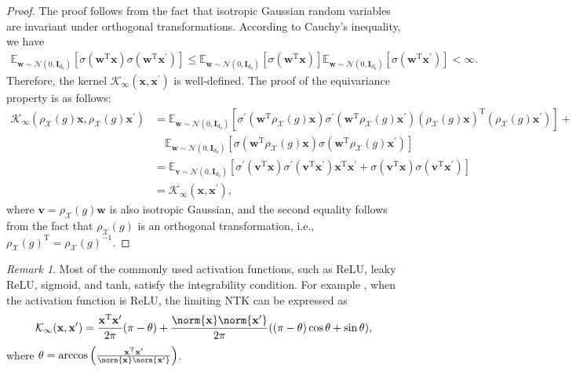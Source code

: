 \documentclass{article}
\newcommand{\T}{\mathrm{T}}
\newcommand{\X}{\mathcal{X}}
\theoremstyle{plain}
\theoremstyle{definition}
\theoremstyle{remark}
\newtheorem{remark}[theorem]{Remark}
\theoremstyle{remark}
\begin{document}
\begin{proof}
  The proof follows from the fact that isotropic Gaussian random variables are invariant under orthogonal transformations.
  According to Cauchy's inequality, we have 
  \begin{align*}
    \mathbb{E}_{\mathbf{w} \sim \mathcal{N}(0, \mathbf{I}_{d_0})}{\left[\sigma\left(\mathbf{w}^{\T} \mathbf{x}\right)\sigma\left(\mathbf{w}^{\T} \mathbf{x}^\prime\right)\right]} \leq \mathbb{E}_{\mathbf{w} \sim \mathcal{N}(0, \mathbf{I}_{d_0})}{\left[\sigma\left(\mathbf{w}^{\T} \mathbf{x}\right)\right]} \mathbb{E}_{\mathbf{w} \sim \mathcal{N}(0, \mathbf{I}_{d_0})}{\left[\sigma\left(\mathbf{w}^{\T} \mathbf{x}^\prime\right)\right]} < \infty.
  \end{align*}
  Therefore, the kernel $\mathcal{K}_{\infty}(\mathbf{x}, \mathbf{x}^\prime)$ is well-defined.
  The proof of the equivariance property is as follows:
  \begin{align*}
    \mathcal{K}_{\infty}(\rho_{\X}(g) \mathbf{x}, \rho_{\X}(g) \mathbf{x}^\prime) 
    & = \mathbb{E}_{\mathbf{w} \sim \mathcal{N}(0, \mathbf{I}_{d_0})}\left[ \sigma^\prime\left(\mathbf{w}^{\T} \rho_{\X}(g) \mathbf{x}\right) \sigma^\prime\left(\mathbf{w}^{\T} \rho_{\X}(g) \mathbf{x}^\prime\right) (\rho_{\X}(g) \mathbf{x})^{\T} (\rho_{\X}(g) \mathbf{x}^\prime)\right] + \\ 
    &\quad  \mathbb{E}_{\mathbf{w} \sim \mathcal{N}(0, \mathbf{I}_{d_0})}\left[  \sigma(\mathbf{w}^{\T} \rho_{\X}(g) \mathbf{x}) \sigma\left(\mathbf{w}^{\T} \rho_{\X}(g) \mathbf{x}^\prime\right)\right] \\ 
    & = \mathbb{E}_{\mathbf{v} \sim \mathcal{N}(0, \mathbf{I}_{d_0})}\left[ \sigma^\prime\left(\mathbf{v}^{\T} \mathbf{x}\right) \sigma^\prime\left(\mathbf{v}^{\T} \mathbf{x}^\prime\right) \mathbf{x}^{\T} \mathbf{x}^{\prime} + \sigma(\mathbf{v}^{\T} \mathbf{x}) \sigma\left(\mathbf{v}^{\T} \mathbf{x}^\prime\right)\right] \\
    & = \mathcal{K}_{\infty}(\mathbf{x}, \mathbf{x}^\prime),
  \end{align*}
  where $\mathbf{v} = \rho_{\X}(g) \mathbf{w}$ is also isotropic Gaussian, and the second equality follows from the fact that $\rho_{\X}(g)$ is an orthogonal transformation, i.e., ${\rho_{\X}(g)}^{\T} ={\rho_{\X}(g)}^{-1} $.
\end{proof}

\begin{remark}
  Most of the commonly used activation functions, such as ReLU, leaky ReLU, sigmoid, and tanh, satisfy the integrability condition. For example \citep{golikov_2022_ntk}, when 
  the activation function is ReLU, the limiting NTK can be expressed as
  \begin{equation}
    \mathcal{K}_{\infty}(\mathbf{x}, \mathbf{x}^\prime) = \frac{\mathbf{x}^{\T}\mathbf{x}^{\prime}}{2\pi} (\pi - \theta) + \frac{\norm{\mathbf{x}}\norm{\mathbf{x}^{\prime}}}{2 \pi} ((\pi - \theta)\cos\theta + \sin\theta),
  \end{equation}
  where $\theta = \arccos\left(\frac{\mathbf{x}^{\T}\mathbf{x}^{\prime}}{\norm{\mathbf{x}}\norm{\mathbf{x}^{\prime}}}\right)$.
\end{remark}
\end{document}
